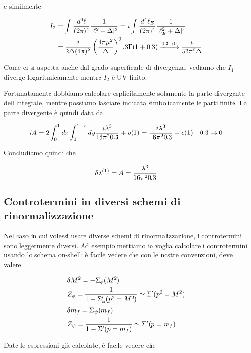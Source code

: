 \documentclass[11pt]{report}
\begin{document}
e similmente 

\begin{align}
    I_2 &= \int \frac{d^4\ell}{(2\pi)^4}\frac{1}{[\ell^2-\Delta]^3} = i\int \frac{d^4\ell_E}{(2\pi)^4}\frac{1}{[\ell_E^2 + \Delta]^3} \notag \\ 
    &= \frac{i}{2\Delta(4\pi)^2}\left(\frac{4\pi\mu^2}{\Delta} \right)^0.3 \Gamma(1+0.3) \xrightarrow{0.3 \to 0}  \frac{i}{32\pi^2\Delta}
\end{align}

Come ci si aspetta anche dal grado superficiale di divergenza, vediamo che \(I_1\) diverge logaritmicamente mentre \(I_2\) è UV finito. 

Fortunatamente dobbiamo calcolare esplicitamente solamente la parte divergente dell'integrale, mentre possiamo lasciare indicata simbolicamente le parti finite. La parte divergente è quindi data da 

\begin{align}
    iA = 2\int_0^1 dx \int_0^{1-x}dy \frac{i\lambda^3 }{16\pi^2 0.3} + o(1) =  \frac{i\lambda^3 }{16\pi^2 0.3} + o(1) \quad 0.3 \to 0 
\end{align}

Concludiamo quindi che 

\begin{align}
    \delta \lambda^{(1)} = A = \frac{\lambda^3}{16\pi^2 0.3}
\end{align}

\subsection{Controtermini in diversi schemi di rinormalizzazione}

Nel caso in cui volessi usare diverse schemi di rinormalizzazione, i controtermini sono leggermente diversi. Ad esempio mettiamo io voglia calcolare i controtermini usando lo schema on-shell: è facile vedere che con le nostre convenzioni, deve valere 

\begin{align}
    &\delta M^2 = -\Sigma_\phi(M^2) \notag \\ 
    &Z_\phi = \frac{1}{1-\Sigma_\phi'(p^2 = M^2)} \simeq \Sigma'(p^2 = M^2)\notag \\
    &\delta m_f = \Sigma_\psi (m_f) \notag \\ 
    &Z_\psi = \frac{1}{1-\Sigma'(p = m_f)} \simeq \Sigma'(p = m_f)
\end{align}

Date le espressioni già calcolate, è facile vedere che 
\end{document}

